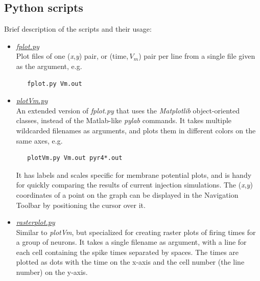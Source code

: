 \documentclass[12pt]{article}
\begin{document}
\subsection*{Python scripts}

Brief description of the scripts and their usage:

\begin{itemize}
\item \href{../g3plot-fplot/g3plot-fplot.tex}{\it fplot.py}\\
Plot files of one ({\it x},{\it y}) pair,
or (time,\,$V_m$) pair per line from a single file given as the argument, e.g.
\begin{verbatim}
   fplot.py Vm.out
\end{verbatim}

\item \href{../g3plot-plotVm/g3plot-plotVm.tex}{\it plotVm.py}\\
An extended version of {\it fplot.py} that uses the {\it Matplotlib}
object-oriented classes, instead of the Matlab-like {\it pylab} commands.  It
takes multiple wildcarded filenames as arguments, and plots them in
different colors on the same axes, e.g.
\begin{verbatim}
   plotVm.py Vm.out pyr4*.out
\end{verbatim}

It has labels and scales specific for membrane potential plots, and is
handy for quickly comparing the results of current injection simulations.
The ({\it x},{\it y}) coordinates of a point on the graph can be displayed in the
Navigation Toolbar by positioning the cursor over it.

\item \href{../g3plot-rasterplot/g3plot-rasterplot.tex}{\it rasterplot.py}\\
Similar to {\it plotVm}, but specialized for creating raster
plots of firing times for a group of neurons.  It takes a single filename
as argument, with a line for each cell containing the spike times separated
by spaces.  The times are plotted as dots with the time on the x-axis and
the cell number (the line number) on the y-axis.


\end{itemize}
\end{document}
